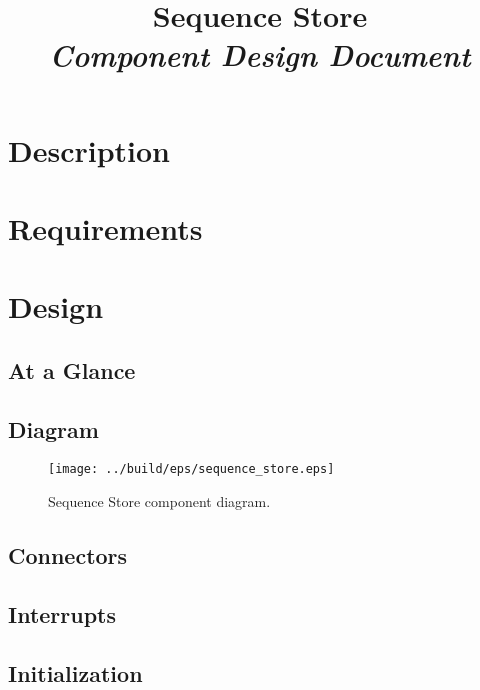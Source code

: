 



\title{\textbf{Sequence Store} \\
\large\textit{Component Design Document}}
\date{}
\maketitle

\section{Description}


\section{Requirements}


\section{Design}

\subsection{At a Glance}


\subsection{Diagram}
\begin{figure}[H]
  \texttt{[image: ../build/eps/sequence\_store.eps]}
  \caption{Sequence Store component diagram.}
\end{figure}

\subsection{Connectors}


\subsection{Interrupts}



\subsection{Initialization}


